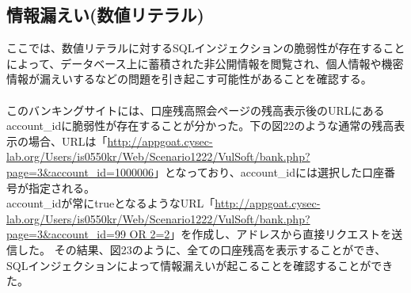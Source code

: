 \documentclass[dvipdfmx,autodetect-engine,titlepage]{jsarticle}
\begin{document}
\subsection{情報漏えい(数値リテラル)}
ここでは、数値リテラルに対するSQLインジェクションの脆弱性が存在することによって、データベース上に蓄積された非公開情報を閲覧され、個人情報や機密情報が漏えいするなどの問題を引き起こす可能性があることを確認する。\\\\
このバンキングサイトには、口座残高照会ページの残高表示後のURLにあるaccount\_idに脆弱性が存在することが分かった。下の図22のような通常の残高表示の場合、URLは「\url{http://appgoat.cysec-lab.org/Users/is0550kr/Web/Scenario1222/VulSoft/bank.php?page=3&account_id=1000006}」となっており、account\_idには選択した口座番号が指定される。\\
account\_idが常にtrueとなるようなURL「\url{http://appgoat.cysec-lab.org/Users/is0550kr/Web/Scenario1222/VulSoft/bank.php?page=3&account_id=99 OR 2=2}」を作成し、アドレスから直接リクエストを送信した。
その結果、図23のように、全ての口座残高を表示することができ、SQLインジェクションによって情報漏えいが起こることを確認することができた。
\end{document}
